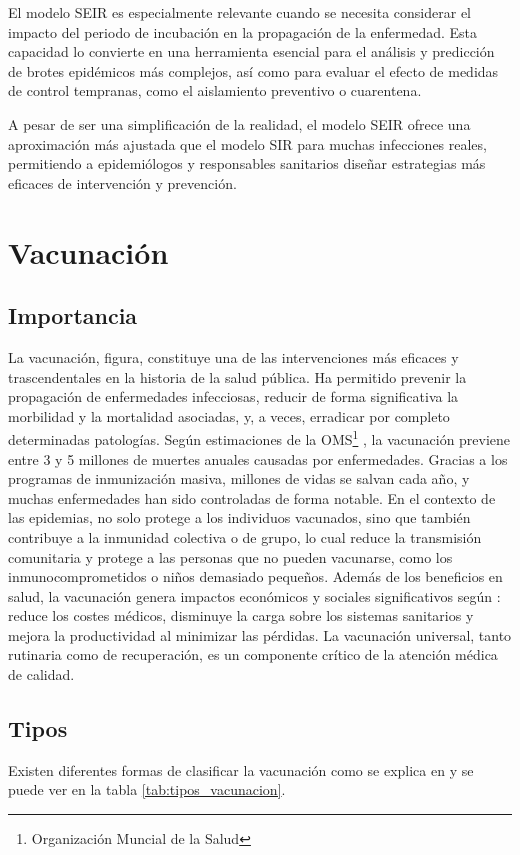\begin{enumerate}
El modelo SEIR es especialmente relevante cuando se necesita considerar el impacto del periodo de incubación en la propagación de la enfermedad. Esta capacidad lo convierte en una herramienta esencial para el análisis y predicción de brotes epidémicos más complejos, así como para evaluar el efecto de medidas de control tempranas, como el aislamiento preventivo o cuarentena.

A pesar de ser una simplificación de la realidad, el modelo SEIR ofrece una aproximación más ajustada que el modelo SIR para muchas infecciones reales, permitiendo a epidemiólogos y responsables sanitarios diseñar estrategias más eficaces de intervención y prevención.





\section{Vacunación}
\subsection{Importancia}
La vacunación, figura, constituye una de las intervenciones más eficaces y trascendentales en la historia de la salud pública. Ha permitido prevenir la propagación de enfermedades infecciosas, reducir de forma significativa la morbilidad y la mortalidad asociadas, y, a veces, erradicar por completo determinadas patologías. Según estimaciones de la OMS\footnote{Organización Muncial de la Salud} \cite{oms_vacunas}, la vacunación previene entre 3 y 5 millones de muertes anuales causadas por enfermedades. Gracias a los programas de inmunización masiva, millones de vidas se salvan cada año, y muchas enfermedades han sido controladas de forma notable. En el contexto de las epidemias, no solo protege a los individuos vacunados, sino que también contribuye a la inmunidad colectiva o de grupo, lo cual reduce la transmisión comunitaria y protege a las personas que no pueden vacunarse, como los inmunocomprometidos o niños demasiado pequeños. Además de los beneficios en salud, la vacunación genera impactos económicos y sociales significativos según \cite{nandi2020vaccines}: reduce los costes médicos, disminuye la carga sobre los sistemas sanitarios y mejora la productividad al minimizar las pérdidas. La vacunación universal, tanto rutinaria como de recuperación, es un componente crítico de la atención médica de calidad.


\subsection{Tipos}
Existen diferentes formas de clasificar la vacunación como se explica en \cite{hhs_vaccines} y se puede ver en la tabla \ref{tab:tipos_vacunacion}.


\end{enumerate}
